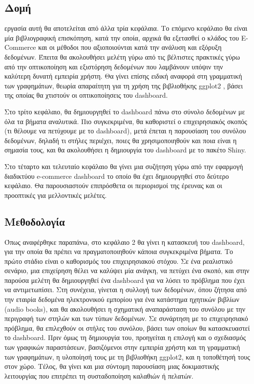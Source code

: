 \documentclass[greek, 12pt]{article}
\begin{document}

\subsection{Δομή}

 εργασία αυτή θα αποτελείται από άλλα τρία κεφάλαια. Το επόμενο κεφάλαιο θα είναι μία βιβλιογραφική επισκόπηση, κατά την οποία, αρχικά θα εξετασθεί ο κλάδος του E-Commerce και οι μέθοδοι που αξιοποιούνται κατά την ανάλυση και εξόρυξη δεδομένων. Έπειτα θα ακολουθήσει μελέτη γύρω από τις βέλτιστες πρακτικές γύρω από την οπτικοποίηση και εξιστόρηση δεδομένων που λαμβάνουν υπόψιν την καλύτερη δυνατή εμπειρία χρήστη. Θα γίνει επίσης ειδική αναφορά στη γραμματική των γραφημάτων, θεωρία απαραίτητη για τη χρήση της βιβλιοθήκης ggplot2 \cite{wickham2016data}, βάσει της οποίας θα χτιστούν οι οπτικοποίησεις του dashboard.

Στο τρίτο κεφάλαιο, θα δημιουργηθεί το dashboard πάνω στο σύνολο δεδομένων με όλα τα βήματα αναλυτικά. Πιο συγκεκριμένα, θα καθοριστεί ο επιχειρησιακός σκοπός (τι θέλουμε να πετύχουμε με το dashboard), μετά έπεται η παρουσίαση του συνόλου δεδομένων, δηλαδή τι στήλες περιέχει, ποιες θα χρησιμοποιηθούν και ποια είναι η σημασία τους, και θα ακολουθήσει η δημιουργία του dashboard με το πακέτο Shiny.

Στο τέταρτο και τελευταίο κεφάλαιο θα γίνει μια συζήτηση γύρω από την εφαρμογή διαδικτύου e-commerce dashboard το οποίο θα έχει δημιουργηθεί στο δεύτερο κεφάλαιο. Θα παρουσιαστούν επιπρόσθετα οι περιορισμοί της έρευνας και οι προοπτικές για μελλοντικές μελέτες.


\subsection{Μεθοδολογία}

Όπως αναφέρθηκε παραπάνω, στο κεφάλαιο 2 θα γίνει η κατασκευή του dashboard, για την οποία θα πρέπει να πραγματοποιηθούν κάποια συγκεκριμένα βήματα. Το πρώτο στάδιο είναι ο καθορισμός του επιχειρησιακού στόχου. Σε ένα ρεαλιστικό σενάριο, μια επιχείρηση θέλει να καλύψει μία ανάγκη, να πετύχει ένα σκοπό, και στην παρούσα μελέτη θα δημιουργηθεί ένα dashboard για να λύσει το πρόβλημα που έχει να αντιμετωπίσει. Στη συνέχεια, γίνεται η συλλογή των δεδομένων, όπου ζήτησα από την εταιρία δεδομένα ηλεκτρονικού εμπορίου για ένα κατάστημα ηχητικών βιβλίων (audio books), και θα ακολουθήσει η σχηματική αναπαράσταση του συνόλου με την περιγραφή των στηλών και των τύπων δεδομένων. Σε συνάρτηση με το επιχειρησιακό πρόβλημα, θα επιλεχθούν οι στήλες του συνόλου, βάσει των οποίων θα κατασκευαστεί το dashboard. Πριν όμως τη δημιουργία του, προηγείται η επιλογή και ο σχεδιασμός των γραφικών παραστάσεων, βασιζόμενοι στην εμπειρία χρήστη και τη γραμματική των γραφημάτων, η υλοποίησή τους με τη βιβλιοθήκη ggplot2, και η τοποθέτησή τους στον χώρο. Τέλος, θα γίνει και μια σύντομη παρουσίαση μιας δοκιμαστικής λειτουργίας που επιτρέπει τη συσταδοποίηση καλαθιών ή πελατών.
\end{document}
